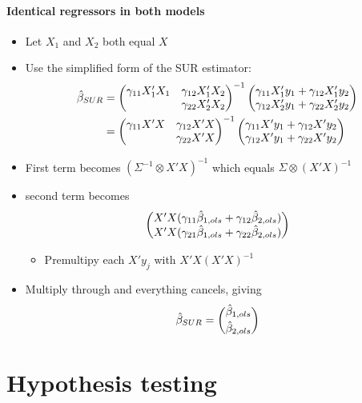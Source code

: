\paragraph{Identical regressors in both models}
\begin{itemize}
\item Let $X_1$ and $X_2$ both equal $X$
\item Use the simplified form of the SUR estimator:
  \begin{align*}
    \hat{\beta}_{SUR}
    &= \begin{pmatrix}
      \gamma_{11} X_1'X_1 & \gamma_{12} X_1'X_2 \\ & \gamma_{22} X_2'X_2 
    \end{pmatrix}^{-1}
    \begin{pmatrix}
      \gamma_{11} X_1'y_1 + \gamma_{12} X_1'y_2 \\ \gamma_{12} X_2'y_1 + \gamma_{22} X_2'y_2
    \end{pmatrix} \\
    &= \begin{pmatrix}
      \gamma_{11} X'X & \gamma_{12} X'X \\ & \gamma_{22}X'X
    \end{pmatrix}^{-1}
    \begin{pmatrix}
      \gamma_{11} X'y_1 + \gamma_{12}X'y_2 \\ \gamma_{12} X'y_1 + \gamma_{22} X'y_2
    \end{pmatrix}
  \end{align*}
\item First term becomes $(\Sigma^{-1} \otimes X'X)^{-1}$ which equals
  $\Sigma \otimes (X'X)^{-1}$
\item second term becomes
  \[\begin{pmatrix}
    X'X (\gamma_{11}\hat{\beta}_{1,ols} + \gamma_{12}\hat{\beta}_{2,ols}) \\
    X'X (\gamma_{21}\hat{\beta}_{1,ols} + \gamma_{22}\hat{\beta}_{2,ols})
  \end{pmatrix}\]
\begin{itemize}
\item Premultipy each $X'y_j$ with $X'X(X'X)^{-1}$
\end{itemize}
\item Multiply through and everything cancels, giving
  \[\hat{\beta}_{SUR} = \binom{\hat{\beta}_{1,ols}}{\hat{\beta}_{2,ols}}\]
\end{itemize}

\section{Hypothesis testing}

